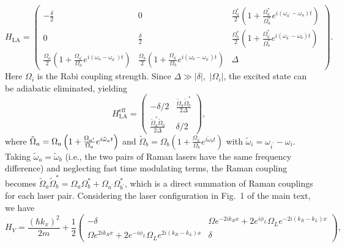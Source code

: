 \documentclass[twocolumn,prl,floatfix,citeautoscript,nofootinbib,superscriptaddress]{revtex4}
\begin{document}
\begin{equation*}
H_{\text{LA}}=\left(
\begin{array}{ccc}
-\frac{\delta }{2} & 0 & \frac{\Omega _{a}^{\ast }}{2}\left( 1+\frac{\Omega
_{a^{\prime }}^{\ast }}{\Omega _{a}^{\ast }}e^{i(\omega _{a^{\prime
}}-\omega _{a})t}\right) \\
0 & \frac{\delta }{2} & \frac{\Omega _{b}^{\ast }}{2}\left( 1+\frac{\Omega
_{b^{\prime }}^{\ast }}{\Omega _{b}^{\ast }}e^{i(\omega _{b^{\prime
}}-\omega _{b})t}\right) \\
\frac{\Omega _{a}}{2}\left( 1+\frac{\Omega _{a^{\prime }}}{\Omega _{a}}%
e^{i(\omega _{a}-\omega _{a^{\prime }})t}\right) & \frac{\Omega _{b}}{2}%
\left( 1+\frac{\Omega _{b^{\prime }}}{\Omega _{b}}e^{i(\omega _{b}-\omega
_{b^{\prime }})t}\right) & \Delta%
\end{array}%
\right) .
\end{equation*}%
Here $\Omega _{i}$ is the Rabi coupling strength. Since $\Delta \gg |\delta
|,$ $\left\vert \Omega _{i}\right\vert $, the excited state can be adiabatic
eliminated, yielding
\begin{equation*}
H_{\text{LA}}^{\mathrm{eff}}=\left(
\begin{array}{cc}
-\delta /2 & \frac{\tilde{\Omega}_{a}\tilde{\Omega}_{b}^{\ast }}{2\Delta }
\\
\frac{\tilde{\Omega}_{a}^{\ast }\tilde{\Omega}_{b}}{2\Delta } & \delta /2%
\end{array}%
\right) ,
\end{equation*}%
where $\tilde{\Omega}_{a}=\Omega _{a}\left( 1+\frac{\Omega _{a^{\prime }}}{%
\Omega _{a}}e^{i\tilde{\omega}_{a}t}\right) $ and $\tilde{\Omega}_{b}=\Omega
_{b}\left( 1+\frac{\Omega _{b^{\prime }}}{\Omega _{b}}e^{i\tilde{\omega}%
_{b}t}\right) $ with $\tilde{\omega}_{i}=\omega _{i^{\prime }}-\omega _{i}$.
Taking $\tilde{\omega}_{a}=\tilde{\omega}_{b}$ (i.e., the two pairs of Raman
lasers have the same frequency difference) and neglecting fast time
modulating terms, the Raman coupling becomes $\tilde{\Omega}_{a}\tilde{\Omega%
}_{b}^{\ast }=\Omega _{a}\Omega _{b}^{\ast }+\Omega _{a^{\prime }}\Omega
_{b^{\prime }}^{\ast }$, which is a direct summation of Raman couplings for
each laser pair. Considering the laser configuration in Fig.~1 of the main
text, we have
\begin{equation*}
H_{V}=\frac{(\hbar k_x)^{2}}{2m}+\frac{1}{2}\left(
\begin{array}{cc}
-\delta & \Omega e^{-2ik_{R}x}+2e^{i\phi _{L}}\Omega
_{L}e^{-2i(k_{R}-k_{L})x} \\
\Omega e^{2ik_{R}x}+2e^{-i\phi _{L}}\Omega _{L}e^{2i(k_{R}-k_{L})x} & \delta%
\end{array}%
\right),
\end{equation*}%
\end{document}
